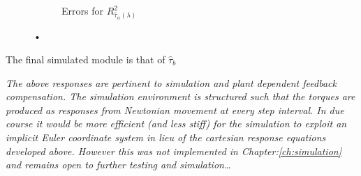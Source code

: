 \begin{figure}[htbp]
\begin{subfigure}{0.49\textwidth}
\caption{Errors for $R^2_{\hat{\tau}_\alpha(\lambda)}$}
\label{fig:tau-alpha-r}
\end{subfigure}
\caption{•}
\end{figure}
\par
The final simulated module is that of $\hat{\tau}_b$
\par
\emph{\color{Gray}The above responses are pertinent to simulation and plant dependent feedback compensation. The simulation environment is structured such that the torques are produced as responses from Newtonian movement at every step interval. In due course it would be more efficient (and less stiff) for the simulation to exploit an implicit Euler\cite{physicallybased,multibodydynamics} coordinate system in lieu of the cartesian response equations developed above. However this was not implemented in Chapter:\ref{ch:simulation} and remains open to further testing and simulation\ldots}
\par
\newpage
